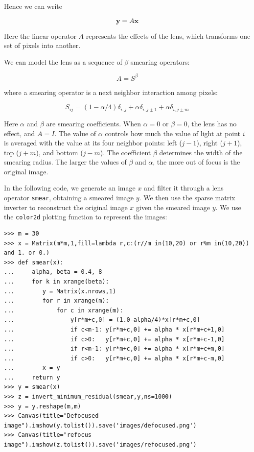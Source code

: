 \documentclass[justified,sixbynine]{tufte-book}
\def\ft{\small\tt}
\theoremstyle{plain}%
\theoremstyle{definition}
\theoremstyle{remark}
\begin{document}
\begin{fullwidth}
Hence we can write

\begin{equation}
\mathbf{y} = A \mathbf{x}
\end{equation}

Here the linear operator $A$ represents the effects of the lens, which transforms one set of pixels into another.

We can model the lens as a sequence of $\beta$ smearing operators:

\begin{equation}
A = S^{\beta}
\end{equation}

where a smearing operator is a next neighbor interaction among pixels:

\begin{equation}
S_{ij} = (1-\alpha/4) \delta_{i,j} + \alpha \delta_{i,j\pm 1} + \alpha \delta_{i,j\pm m}
\end{equation}

Here $\alpha$ and $\beta$ are smearing coefficients. When $\alpha=0$ or $\beta=0$, the lens has no effect, and $A = I$. The value of $\alpha$ controls how much the value of light at point $i$ is averaged with the value at its four neighbor points: left ($j-1$), right ($j+1$), top ($j+m$), and bottom ($j-m$). The coefficient $\beta$ determines the width of the smearing radius. The larger the values of $\beta$ and $\alpha$, the more out of focus is the original image.


In the following code, we generate an image $x$ and filter it through a lens operator {\ft smear}, obtaining a smeared image $y$. We then use the sparse matrix inverter to reconstruct the original image $x$ given the smeared image $y$. We use the {\ft color2d} plotting function to represent the images:

\begin{lstlisting}[caption={in file: {\ft nlib.py}}]
>>> m = 30
>>> x = Matrix(m*m,1,fill=lambda r,c:(r//m in(10,20) or r%m in(10,20)) and 1. or 0.)
>>> def smear(x):
...     alpha, beta = 0.4, 8
...     for k in xrange(beta):
...        y = Matrix(x.nrows,1)
...        for r in xrange(m):
...            for c in xrange(m):
...                y[r*m+c,0] = (1.0-alpha/4)*x[r*m+c,0]
...                if c<m-1: y[r*m+c,0] += alpha * x[r*m+c+1,0]
...                if c>0:   y[r*m+c,0] += alpha * x[r*m+c-1,0]
...                if r<m-1: y[r*m+c,0] += alpha * x[r*m+c+m,0]
...                if c>0:   y[r*m+c,0] += alpha * x[r*m+c-m,0]
...        x = y
...     return y
>>> y = smear(x)
>>> z = invert_minimum_residual(smear,y,ns=1000)
>>> y = y.reshape(m,m)
>>> Canvas(title="Defocused image").imshow(y.tolist()).save('images/defocused.png')
>>> Canvas(title="refocus image").imshow(z.tolist()).save('images/refocused.png')
\end{lstlisting}


\end{fullwidth}
\end{document}
